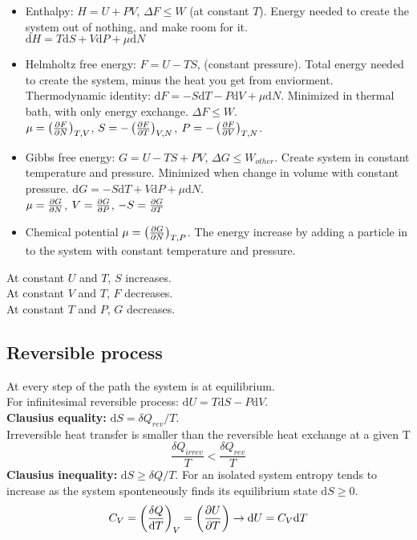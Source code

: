 \documentclass[a4paper, norsk, 8pt]{article}
\begin{document}
\begin{multicols*}{3}
\begin{itemize}
    \item Enthalpy: $H=U+PV$,  $\Delta F \leq W$ (at constant $T$). Energy needed to create the system out of nothing, and make room for it. \\$\mbox{d}H = T\mbox{d}S + V\mbox{d}P +\mu \mbox{d}N$

    \item Helmholtz free energy: $F=U-TS$, (constant pressure). Total energy needed to create the system, minus the heat you get from enviorment. Thermodynamic identity: $\mbox{d}F=-S\mbox{d}T-P\mbox{d}V+\mu\mbox{d}N$. Minimized in thermal bath, with only energy exchange. $\Delta F \leq W$. \\ $\mu=\left( \pdv{F}{N} \right)_{T,V}$, $S=-\left( \pdv{F}{T} \right)_{V, N}$, $P=-\left(\pdv{F}{V}\right)_{T,N}$.

    \item  Gibbs free energy: $G=U-TS+PV$, $\Delta G \leq W_{other}$. Create system in constant temperature and pressure. Minimized when change in volume with constant pressure. $\mbox{d}G = -S\mbox{d}T + V\mbox{d}P +\mu \mbox{d}N$. \\ $\mu=\pdv{G}{N}$, $V = \pdv{G}{P}$, $-S=\pdv{G}{T}$
    \item Chemical potential $\mu=\left(\pdv{G}{N}\right)_{T,P}$. The energy increase by adding a particle in to the system with constant temperature and pressure.
\end{itemize}
At constant $U$ and $T$, $S$ increases.\\
At constant $V$ and $T$, $F$ decreases.\\
At constant $T$ and $P$, $G$ decreases.\\

\subsection*{\footnotesize  Reversible process}
At every step of the path the system is at equilibrium.\\ For infinitesimal reversible process: $\mbox{d}U = T\mbox{d}S - P \mbox{d}V$.\\
\textbf{Clausius equality:} $\mbox{d}S = \delta Q_{rev}/T$.\\
Irreversible	heat	transfer		is	smaller than the reversible	heat
exchange at	a	given	T
$$\frac{\delta Q_{irrev}}{T}  < \frac{\delta Q_{rev}}{T} $$
\textbf{Clausius inequality:} $\mbox{d}S \geq \delta Q/T$. For an isolated system entropy tends to	increase as	the system	sponteneously finds its equilibrium state $\mbox{d}S \geq 0$.
\begin{align*}
  C_V = \left( \frac{\delta Q}{\mbox{d}T} \right)_V = \left( \pdv{U}{T} \right) \rightarrow \mbox{d}U = C_V \mbox{d}T
\end{align*}


\end{multicols*}
\end{document}
